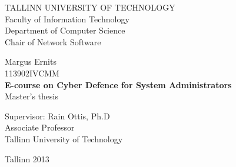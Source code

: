 \begin{titlepage}
	\begingroup
		\singlespace
		\begin{center}
			TALLINN UNIVERSITY OF TECHNOLOGY \\
			Faculty of Information Technology \\
			Department of Computer Science \\
			Chair of Network Software
		
			\vfill
				Margus Ernits \\
				113902IVCMM \\[1.5cm]
				\LARGE \textbf{E-course on Cyber Defence for System Administrators} \\[1cm]
				\normalsize Master's thesis \\[4cm]

				\begin{flushright}
					Supervisor: Rain Ottis, Ph.D \\
					Associate Professor \\
					Tallinn University of Technology
					
				\end{flushright}
			\vfill

			Tallinn 2013
		\end{center}
	\endgroup
\end{titlepage}